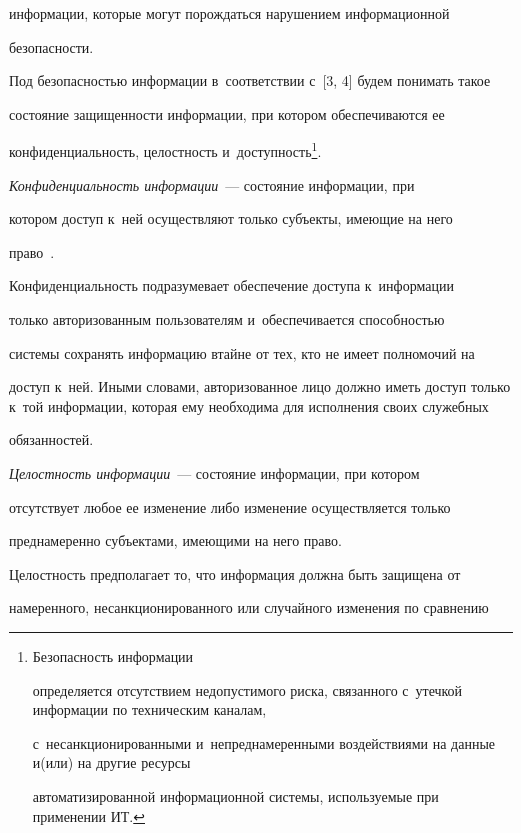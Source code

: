 информации, которые могут по\-рож\-дать\-ся нарушением информационной 

безопасности.

  

Под безопасностью информации в~соответствии с~[3, 4] будем понимать такое 

состояние защищенности информации, при котором обеспечиваются ее 

конфиденциальность, целостность и~доступность\footnote{Безопасность информации 

определяется отсутствием недопустимого риска, связанного с~утечкой информации по техническим каналам, 

с~несанкционированными и~непреднамеренными воздействиями на данные и(или) на другие ресурсы 

автоматизированной информационной системы, используемые при применении ИТ.}. 

   

  \textit{Конфиденциальность информации}~--- со\-сто\-яние информации, при 

котором до\-ступ к~ней осуществляют только субъекты, имеющие на него 

право~\cite{4-zac}. 

  

  Конфиденциальность подразумевает обеспечение доступа к~информации 

только авторизованным пользователям и~обеспечивается способностью  

сис\-те\-мы сохранять информацию втайне от тех, кто не имеет полномочий на 

доступ к~ней. Иными словами, авторизованное лицо должно иметь доступ только к~той информации, которая ему необходима для исполнения своих служебных 

обязанностей.

{



}

  

  \textit{Целостность информации}~--- состояние информации, при котором 

отсутствует любое ее изменение либо изменение осуществляется только 

преднамеренно субъектами, имеющими на него право.

  

  Целостность предполагает то, что информация должна быть защищена от 

намеренного, несанкционированного или случайного изменения по сравнению 

